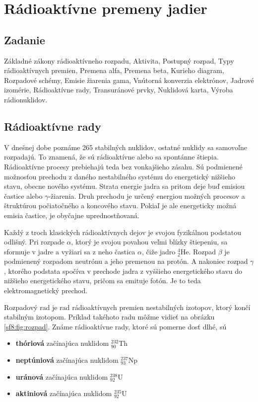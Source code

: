 \documentclass[../../main.tex]{subfiles}
\begin{document}
\chapter{Rádioaktívne premeny jadier}
\section{Zadanie}

Základné zákony rádioaktívneho rozpadu, Aktivita, Postupný rozpad, Typy rádioaktívnych premien, Premena alfa, Premena beta, Kurieho diagram, Rozpadové schémy, Emisie žiarenia gama, Vnútorná konverzia elektrónov, Jadrové izomérie, Rádioaktívne rady, Transuránové prvky, Nuklidová karta, Výroba rádionuklidov.

\section{Rádioaktívne rady}
V dnešnej dobe poznáme 265 stabilných nuklidov, ostatné nuklidy sa samovoľne rozpadajú. To znamená, že sú rádioaktívne alebo sa spontánne štiepia. Rádioaktívne procesy prebiehajú teda bez vonkajšieho zásahu. Sú podmienené možnosťou prechodu z daného nestabilného systému do energetický nižšieho stavu, obecne nového systému. Strata energie jadra sa pritom deje buď emisiou častice alebo $\gamma$-žiarenia. Druh prechodu je určený energiou možných procesov a štruktúrou počiatočného a koncového stavu. Pokiaľ je ale energeticky možná emisia častice, je obyčajne uprednostňovaná.

Každý z troch klasických rádioaktívnych dejov je svojou fyzikálnou podstatou odlišný. Pri rozpade $\alpha$, ktorý je svojou povahou veľmi blízky štiepeniu, sa sformuje v jadre a vyžiari sa z neho častica $\alpha$, čiže jadro $_{2}^{4}$He. Rozpad $\beta$ je podmienený rozpadom neutrónu a jeho premenou na protón. A nakoniec rozpad $\gamma$, ktorého podstata spočíva v prechode jadra z vyššieho energetického stavu do nižšieho energetického stavu, pričom sa emituje fotón. Je to teda elektromagnetický prechod.  

Rozpadový rad je rad rádioaktívnych premien nestabilných izotopov, ktorý končí stabilným izotopom. Príklad takéhoto radu môžme vidieť na obrázku \ref{sf8:fig:rozpad}. Známe rádioaktívne rady, ktoré sú pomerne dosť dlhé, sú
\begin{itemize}
\item \textbf{thóriová} začínajúca nuklidom $_{90}^{232}$Th
\item \textbf{neptúniová} začínajúca nuklidom $_{93}^{237}$Np
\item \textbf{uránová} začínajúca nuklidom $_{92}^{238}$U
\item \textbf{aktiniová} začínajúca nuklidom $_{92}^{235}$U
\end{itemize}
\end{document}
